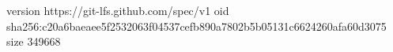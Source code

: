 version https://git-lfs.github.com/spec/v1
oid sha256:c20a6baeaee5f2532063f04537cefb890a7802b5b05131c6624260afa60d3075
size 349668
